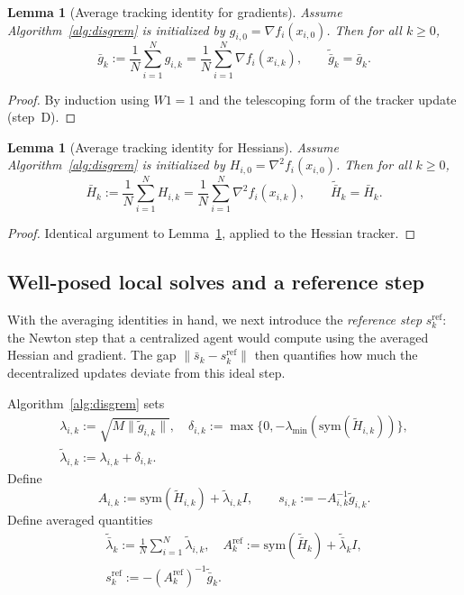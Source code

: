 \documentclass[10pt,twocolumn,letterpaper]{article}
\def\one{1}%
\theoremstyle{compact}
\newtheorem{lemma}[theorem]{Lemma}
\theoremstyle{compactremark}
\newcommand{\one}{\mathbf{1}}
\begin{document}
\begin{lemma}[Average tracking identity for gradients]\label{lem:avg-track-g}
Assume Algorithm~\ref{alg:disgrem} is initialized by $g_{i,0}=\nabla f_i(x_{i,0})$.
Then for all $k\ge0$,
\[
\bar g_k:=\frac1N\sum_{i=1}^N g_{i,k}=\frac1N\sum_{i=1}^N\nabla f_i(x_{i,k}),
\qquad
\tilde{\bar g}_k=\bar g_k.
\]
\end{lemma}
\begin{proof}
By induction using $W\one=\one$ and the telescoping form of the tracker update (step~D).
\end{proof}

\begin{lemma}[Average tracking identity for Hessians]\label{lem:avg-track-h}
Assume Algorithm~\ref{alg:disgrem} is initialized by $H_{i,0}=\nabla^2 f_i(x_{i,0})$.
Then for all $k\ge0$,
\[
\bar H_k:=\frac1N\sum_{i=1}^N H_{i,k}=\frac1N\sum_{i=1}^N\nabla^2 f_i(x_{i,k}),
\qquad
\tilde{\bar H}_k=\bar H_k.
\]
\end{lemma}
\begin{proof}
Identical argument to Lemma~\ref{lem:avg-track-g}, applied to the Hessian tracker.
\end{proof}

\subsection{Well-posed local solves and a reference step}\label{ssec:refstep}
With the averaging identities in hand, we next introduce the
\emph{reference step} $s_k^{\mathrm{ref}}$: the Newton step that a
centralized agent would compute using the averaged Hessian and gradient.
The gap $\|\bar s_k - s_k^{\mathrm{ref}}\|$ then quantifies how much the
decentralized updates deviate from this ideal step.

Algorithm~\ref{alg:disgrem} sets
\begin{gather*}
\lambda_{i,k}:=\sqrt{M\|\tilde g_{i,k}\|},\quad
\delta_{i,k}:=\max\{0,-\lambda_{\min}(\mathrm{sym}(\tilde H_{i,k}))\},\\
\tilde\lambda_{i,k}:=\lambda_{i,k}+\delta_{i,k}.
\end{gather*}
Define
\[
A_{i,k}:=\mathrm{sym}(\tilde H_{i,k})+\tilde\lambda_{i,k}I,
\qquad
s_{i,k}:=-A_{i,k}^{-1}\tilde g_{i,k}.
\]
Define averaged quantities
\begin{gather*}
\tilde{\bar\lambda}_k:=\tfrac1N\textstyle\sum_{i=1}^N \tilde\lambda_{i,k},\quad
A_k^{\mathrm{ref}}:=\mathrm{sym}(\tilde{\bar H}_k)+\tilde{\bar\lambda}_k I,\\
s_k^{\mathrm{ref}}:=-(A_k^{\mathrm{ref}})^{-1}\tilde{\bar g}_k.
\end{gather*}
\end{document}
